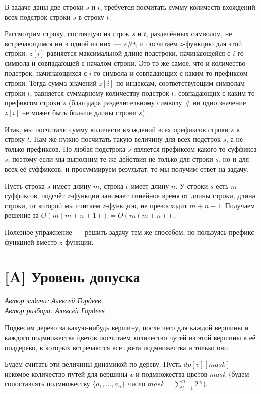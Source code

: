 \documentclass[12pt]{article}
\theoremstyle{definition}
\begin{document}
В задаче даны две строки $s$ и $t$, требуется посчитать сумму количеств вхождений всех подстрок строки $s$ в строку $t$.

Рассмотрим строку, состоящую из строк $s$ и $t$, разделённых символом, не встречающимся ни в одной из них~--- $s\#t$, и посчитаем $z$-функцию для этой строки. $z[i]$ равняется максимальной длине подстроки, начинающейся с $i$-го символа и совпадающей с началом строки. Это то же самое, что и количество подстрок, начинающихся с $i$-го символа и совпадающих с каким-то префиксом строки. Тогда сумма значений $z[i]$ по индексам, соответствующим символам строки $t$, равняется суммарному количеству подстрок $t$, совпадающих с каким-то префиксом строки $s$ (благодаря разделительному символу $\#$ ни одно значение $z[i]$ не может быть больше длины строки $s$).

Итак, мы посчитали сумму количеств вхождений всех префиксов строки $s$ в строку $t$. Нам же нужно посчитать такую величину для всех подстрок $s$, а не только префиксов. Но любая подстрока $s$ является префиксом какого-то суффикса $s$, поэтому если мы выполним те же действия не только для строки $s$, но и для всех её суффиксов, и просуммируем результат, то мы получим ответ на задачу.

Пусть строка $s$ имеет длину $m$, строка $t$ имеет длину $n$. У строки $s$ есть $m$ суффиксов, подсчёт $z$-функции занимает линейное время от длины строки, длина строки, от которой мы считаем $z$-функцию, не превосходит $m+n+1$. Получаем решение за $O(m(m+n+1))=O(m(m+n))$.

Полезное упражнение~--- решить задачу тем же способом, но пользуясь префикс-функцией вместо $z$-функции.

\pagebreak

\section{[A] Уровень допуска}
\textit{Автор задачи: Алексей Гордеев.} \\
\textit{Автор разбора: Алексей Гордеев.}

Подвесим дерево за какую-нибудь вершину, после чего для каждой вершины и каждого подмножества цветов посчитаем количество путей из этой вершины в её поддерево, в которых встречаются все цвета подмножества и только они.

Будем считать эти величины динамикой по дереву. Пусть $dp[v][mask]$~--- искомое количество путей для вершины $v$ и подмножества цветов $mask$ (будем сопоставлять подмножеству $\{a_1,\dots,a_n\}$ число $mask=\sum_{i=1}^n 2^{a_i}$).
\end{document}
